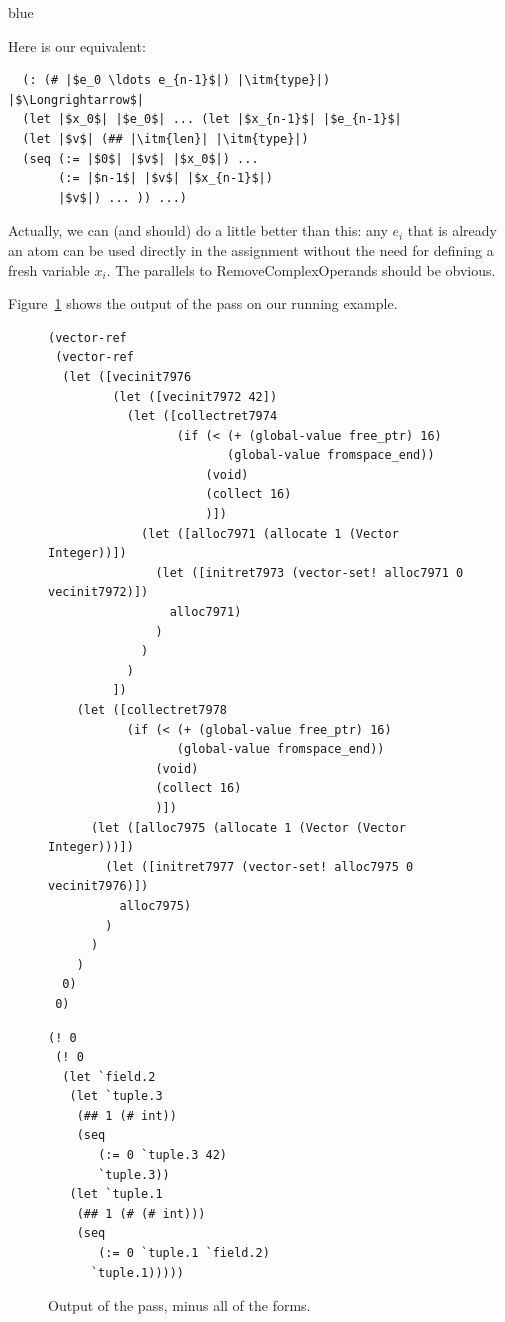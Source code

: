 \documentclass[11pt]{book}
\newenvironment{ocamlx}{
  \begin{color}{blue}
}
{
  \end{color}
}
\begin{document}
\begin{ocamlx}
  Here is our equivalent:
\begin{lstlisting}
  (: (# |$e_0 \ldots e_{n-1}$|) |\itm{type}|)
|$\Longrightarrow$|
  (let |$x_0$| |$e_0$| ... (let |$x_{n-1}$| |$e_{n-1}$|
  (let |$v$| (## |\itm{len}| |\itm{type}|)
  (seq (:= |$0$| |$v$| |$x_0$|) ...
       (:= |$n-1$| |$v$| |$x_{n-1}$|)
       |$v$|) ... )) ...)
\end{lstlisting}
Actually, we can (and should) do a little better than this: any $e_i$ that is already an atom can
be used directly in the assignment without the need for defining a fresh variable $x_i$.  The
parallels to RemoveComplexOperands should be obvious.
\end{ocamlx}

Figure~\ref{fig:expose-alloc-output} shows the output of the
 pass on our running example.

\begin{figure}[tbp]
\begin{lstlisting}
(vector-ref
 (vector-ref
  (let ([vecinit7976
         (let ([vecinit7972 42])
           (let ([collectret7974
                  (if (< (+ (global-value free_ptr) 16) 
                         (global-value fromspace_end))
                      (void)
                      (collect 16)
                      )])
             (let ([alloc7971 (allocate 1 (Vector Integer))])
               (let ([initret7973 (vector-set! alloc7971 0 vecinit7972)])
                 alloc7971)
               )
             )
           )
         ])
    (let ([collectret7978
           (if (< (+ (global-value free_ptr) 16)
                  (global-value fromspace_end))
               (void)
               (collect 16)
               )])
      (let ([alloc7975 (allocate 1 (Vector (Vector Integer)))])
        (let ([initret7977 (vector-set! alloc7975 0 vecinit7976)])
          alloc7975)
        )
      )
    )
  0)
 0)
\end{lstlisting}
\begin{lstlisting}[style=ocaml]
(! 0 
 (! 0 
  (let `field.2 
   (let `tuple.3 
    (## 1 (# int)) 
    (seq 
       (:= 0 `tuple.3 42)
       `tuple.3)) 
   (let `tuple.1 
    (## 1 (# (# int))) 
    (seq 
       (:= 0 `tuple.1 `field.2)
      `tuple.1)))))
\end{lstlisting}
\caption{Output of the  pass, minus
  all of the  forms.}
\label{fig:expose-alloc-output}
\end{figure}
\end{document}
